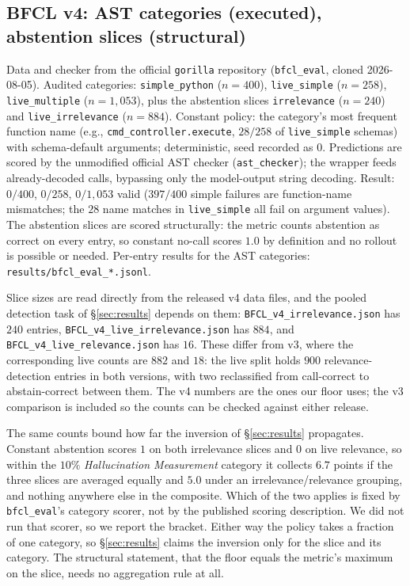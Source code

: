 \documentclass{article}
\theoremstyle{plain}
\theoremstyle{definition}
\begin{document}
\subsection{BFCL v4: AST categories (executed), abstention slices (structural)}
Data and checker from the official \texttt{gorilla} repository (\texttt{bfcl\_eval}, cloned 2026-08-05). Audited categories: \texttt{simple\_python} ($n{=}400$), \texttt{live\_simple} ($n{=}258$), \texttt{live\_multiple} ($n{=}1{,}053$), plus the abstention slices \texttt{irrelevance} ($n{=}240$) and \texttt{live\_irrelevance} ($n{=}884$). Constant policy: the category's most frequent function name (e.g., \texttt{cmd\_controller.execute}, $28/258$ of \texttt{live\_simple} schemas) with schema-default arguments; deterministic, seed recorded as $0$. Predictions are scored by the unmodified official AST checker (\texttt{ast\_checker}); the wrapper feeds already-decoded calls, bypassing only the model-output string decoding. Result: $0/400$, $0/258$, $0/1{,}053$ valid ($397/400$ simple failures are function-name mismatches; the $28$ name matches in \texttt{live\_simple} all fail on argument values). The abstention slices are scored structurally: the metric counts abstention as correct on every entry, so constant no-call scores $1.0$ by definition and no rollout is possible or needed. Per-entry results for the AST categories: \texttt{results/bfcl\_eval\_*.jsonl}.

Slice sizes are read directly from the released v4 data files, and the pooled detection task of \S\ref{sec:results} depends on them: \texttt{BFCL\_v4\_irrelevance.json} has $240$ entries, \texttt{BFCL\_v4\_live\_irrelevance.json} has $884$, and \texttt{BFCL\_v4\_live\_relevance.json} has $16$. These differ from v3, where the corresponding live counts are $882$ and $18$: the live split holds $900$ relevance-detection entries in both versions, with two reclassified from call-correct to abstain-correct between them. The v4 numbers are the ones our floor uses; the v3 comparison is included so the counts can be checked against either release.

The same counts bound how far the inversion of \S\ref{sec:results} propagates. Constant abstention scores $1$ on both irrelevance slices and $0$ on live relevance, so within the $10\%$ \emph{Hallucination Measurement} category it collects $6.7$ points if the three slices are averaged equally and $5.0$ under an irrelevance/relevance grouping, and nothing anywhere else in the composite. Which of the two applies is fixed by \texttt{bfcl\_eval}'s category scorer, not by the published scoring description. We did not run that scorer, so we report the bracket. Either way the policy takes a fraction of one category, so \S\ref{sec:results} claims the inversion only for the slice and its category. The structural statement, that the floor equals the metric's maximum on the slice, needs no aggregation rule at all.
\end{document}
